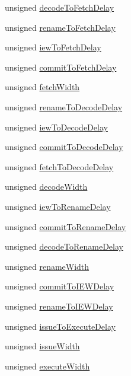 \begin{DoxyCompactItemize}
\item 
unsigned \hyperlink{classSimpleParams_a97e1227d5c901d5a963a9e1291546e94}{decodeToFetchDelay}
\item 
unsigned \hyperlink{classSimpleParams_a07ff4be96da3b524aeeb9eef3527cf3e}{renameToFetchDelay}
\item 
unsigned \hyperlink{classSimpleParams_ae05a2d426504ed1225f3ac8bd5470aa8}{iewToFetchDelay}
\item 
unsigned \hyperlink{classSimpleParams_aea441a34c10691a8595b974e81e4460d}{commitToFetchDelay}
\item 
unsigned \hyperlink{classSimpleParams_a89b5ed63a2dba82556b909f343319416}{fetchWidth}
\item 
unsigned \hyperlink{classSimpleParams_a91ed441be4af4846c8fefff71730af71}{renameToDecodeDelay}
\item 
unsigned \hyperlink{classSimpleParams_af8a3a6df8c39f21d1c1e2a701cbc7ffa}{iewToDecodeDelay}
\item 
unsigned \hyperlink{classSimpleParams_a455c391431e02017b3383a5cd4140adc}{commitToDecodeDelay}
\item 
unsigned \hyperlink{classSimpleParams_a095cf21fa0e724a54b4741d7ee6f9607}{fetchToDecodeDelay}
\item 
unsigned \hyperlink{classSimpleParams_aecf92f13590eed742e3064a4fdb5e004}{decodeWidth}
\item 
unsigned \hyperlink{classSimpleParams_a0b2aa1414e578bb08fd11205201661df}{iewToRenameDelay}
\item 
unsigned \hyperlink{classSimpleParams_a03ebbedbf40ac0005574e50b3577a651}{commitToRenameDelay}
\item 
unsigned \hyperlink{classSimpleParams_a8f7805485d4c7a33dceeccb8dabdeacf}{decodeToRenameDelay}
\item 
unsigned \hyperlink{classSimpleParams_a4b41704382bddb6ee06b5ce97b47dd7b}{renameWidth}
\item 
unsigned \hyperlink{classSimpleParams_a92c8d68d5f0e17758f89daa2647196f5}{commitToIEWDelay}
\item 
unsigned \hyperlink{classSimpleParams_abe3876c3cc3d8a356bb311b9893e99e3}{renameToIEWDelay}
\item 
unsigned \hyperlink{classSimpleParams_a249d9914d9a74eb91386822a0a224f43}{issueToExecuteDelay}
\item 
unsigned \hyperlink{classSimpleParams_a574eb3fb1659bd364f4f613662fa2ead}{issueWidth}
\item 
unsigned \hyperlink{classSimpleParams_a148b680a4d13d1f01de1ab3edd1f9b28}{executeWidth}

\end{DoxyCompactItemize}
